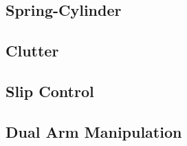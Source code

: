 \subsection{Spring-Cylinder}
\label{sec:spring_cylinder}


\subsection{Clutter}
\label{sec:clutter}


\subsection{Slip Control}
\label{sec:slip_control}


\subsection{Dual Arm Manipulation}
\label{sec:dual_arm}

